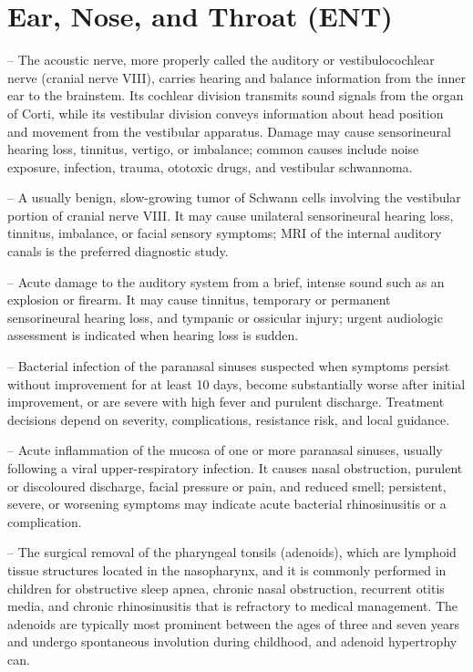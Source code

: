 \chapter{Ear, Nose, and Throat (ENT)}

-- The acoustic nerve, more properly called the auditory or vestibulocochlear nerve (cranial nerve VIII), carries hearing and balance information from the inner ear to the brainstem. Its cochlear division transmits sound signals from the organ of Corti, while its vestibular division conveys information about head position and movement from the vestibular apparatus. Damage may cause sensorineural hearing loss, tinnitus, vertigo, or imbalance; common causes include noise exposure, infection, trauma, ototoxic drugs, and vestibular schwannoma.

-- A usually benign, slow-growing tumor of Schwann cells involving the vestibular portion of cranial nerve VIII. It may cause unilateral sensorineural hearing loss, tinnitus, imbalance, or facial sensory symptoms; MRI of the internal auditory canals is the preferred diagnostic study.

-- Acute damage to the auditory system from a brief, intense sound such as an explosion or firearm. It may cause tinnitus, temporary or permanent sensorineural hearing loss, and tympanic or ossicular injury; urgent audiologic assessment is indicated when hearing loss is sudden.

-- Bacterial infection of the paranasal sinuses suspected when symptoms persist without improvement for at least 10 days, become substantially worse after initial improvement, or are severe with high fever and purulent discharge. Treatment decisions depend on severity, complications, resistance risk, and local guidance.

-- Acute inflammation of the mucosa of one or more paranasal sinuses, usually following a viral upper-respiratory infection. It causes nasal obstruction, purulent or discoloured discharge, facial pressure or pain, and reduced smell; persistent, severe, or worsening symptoms may indicate acute bacterial rhinosinusitis or a complication.

-- The surgical removal of the pharyngeal tonsils (adenoids), which are lymphoid tissue structures located in the nasopharynx, and it is commonly performed in children for obstructive sleep apnea, chronic nasal obstruction, recurrent otitis media, and chronic rhinosinusitis that is refractory to medical management. The adenoids are typically most prominent between the ages of three and seven years and undergo spontaneous involution during childhood, and adenoid hypertrophy can.

